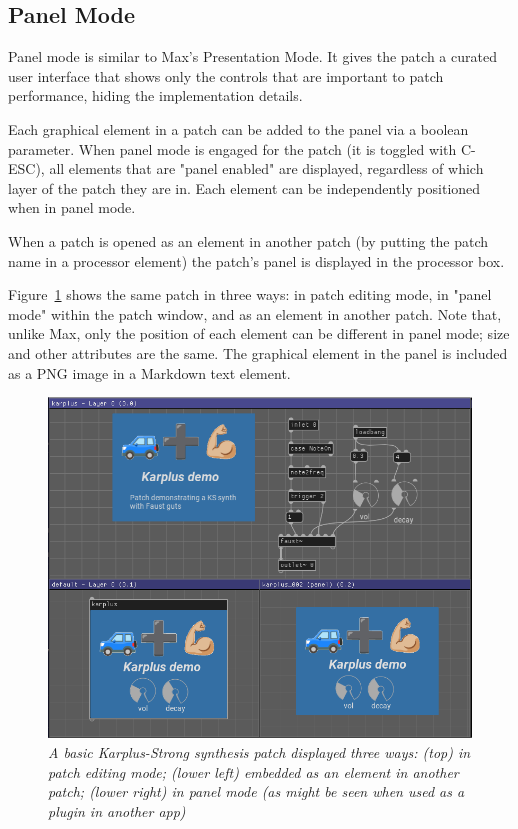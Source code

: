 \documentclass[a4paper]{article}
\begin{document}
\subsection{Panel Mode}

Panel mode is similar to Max's Presentation Mode. It gives the patch a
curated user interface that shows only the controls that are important
to patch performance, hiding the implementation details.

Each graphical element in a patch can be added to the panel via a
boolean parameter. When panel mode is engaged for the patch (it
is toggled with C-ESC), all elements that are "panel enabled" are
displayed, regardless of which layer of the patch they are in.
Each element can be independently positioned when in panel mode.

When a patch is opened as an element in another patch (by putting the
patch name in a processor element) the patch's panel is displayed in the
processor box.

Figure~\ref{fig:karplus} shows the same patch in three ways: in
patch editing mode, in "panel mode" within the patch window, and
as an element in another patch. Note that, unlike Max, only the
position of each element can be different in panel mode; size and
other attributes are the same. The graphical element in the panel
is included as a PNG image in a Markdown text element.

\begin{figure}[ht]
\centerline{\includegraphics[width=5in]{karplus-three-ways.png}}
\caption{\label{fig:karplus}{
    \it A basic Karplus-Strong synthesis patch displayed three ways: (top)
    in patch editing mode; (lower left) embedded as an element in another
    patch; (lower right) in panel mode (as might be seen when used as a
    plugin in another app)
}}
\end{figure}
\end{document}
